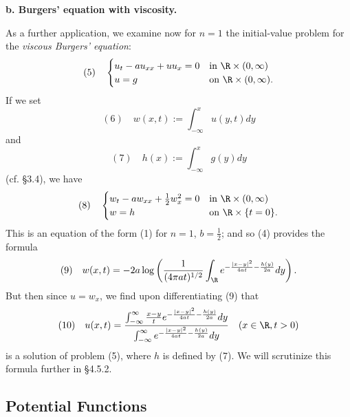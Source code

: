 \textbf{b. Burgers' equation with viscosity.}

\begin{example}
\label{ex:viscous-burgers-hopf-cole}
As a further application, we examine now for $n = 1$ the initial-value problem for the \textit{viscous Burgers' equation}:
$$(5) \quad \begin{cases} u_t - au_{xx} + uu_x = 0 & \text{in } \R \times (0, \infty) \\ u = g & \text{on } \R \times (0, \infty). \end{cases}$$
If we set
$$(6) \quad w(x,t) := \int_{-\infty}^x u(y,t) dy$$
and
$$(7) \quad h(x) := \int_{-\infty}^x g(y) dy$$
(cf. \S3.4), we have
$$(8) \quad \begin{cases} w_t - aw_{xx} + \frac{1}{2}w_x^2 = 0 & \text{in } \R \times (0, \infty) \\ w = h & \text{on } \R \times \{t = 0\}. \end{cases}$$
This is an equation of the form (1) for $n = 1$, $b = \frac{1}{2}$; and so (4) provides the formula
$$(9) \quad w(x,t) = -2a \log \left( \frac{1}{(4\pi at)^{1/2}} \int_{\R} e^{-\frac{|x-y|^2}{4at} - \frac{h(y)}{2a}} dy \right).$$
But then since $u = w_x$, we find upon differentiating (9) that
$$(10) \quad u(x,t) = \frac{\int_{-\infty}^\infty \frac{x-y}{t} e^{-\frac{|x-y|^2}{4at} - \frac{h(y)}{2a}} dy}{\int_{-\infty}^\infty e^{-\frac{|x-y|^2}{4at} - \frac{h(y)}{2a}} dy} \quad (x \in \R, t > 0)$$
is a solution of problem (5), where $h$ is defined by (7). We will scrutinize this formula further in \S4.5.2.
\end{example}

\subsection{Potential Functions}
\label{sec:potential-functions}

